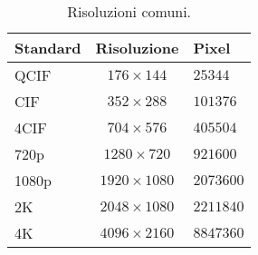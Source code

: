 \begin{table}[h!]
  \centering
  \begin{tabular}{|l|c|l|}
    \hline
    Standard & Risoluzione & Pixel \\ \hline \hline \hline
    QCIF & $176\times144$ & $25344$ \\ \hline
    CIF & $352\times288$ & $101376$ \\ \hline
    4CIF & $704\times576$ & $405504$ \\ \hline
    720p & $1280\times720$ & $921600$ \\ \hline
    1080p & $1920\times1080$ & $2073600$ \\ \hline
    2K & $2048\times1080$ & $2211840$ \\ \hline
    4K & $4096\times2160$ & $8847360$ \\ \hline
  \end{tabular}
  \caption{Risoluzioni comuni.}
  \label{tabel-resolutions}
\end{table}

